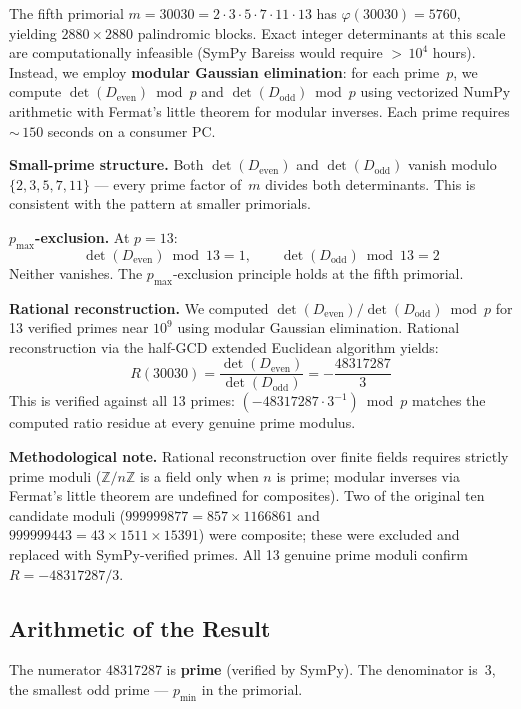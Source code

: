 \documentclass[11pt,letterpaper]{article}
\theoremstyle{definition}
\begin{document}
The fifth primorial $m = 30030 = 2 \cdot 3 \cdot 5 \cdot 7 \cdot 11 \cdot 13$ has $\varphi(30030) = 5760$, yielding $2880 \times 2880$ palindromic blocks. Exact integer determinants at this scale are computationally infeasible (SymPy Bareiss would require ${>}\,10^4$ hours). Instead, we employ \textbf{modular Gaussian elimination}: for each prime~$p$, we compute $\det(D_{\text{even}}) \bmod p$ and $\det(D_{\text{odd}}) \bmod p$ using vectorized NumPy arithmetic with Fermat's little theorem for modular inverses. Each prime requires ${\sim}\,150$ seconds on a consumer PC.

\medskip
\textbf{Small-prime structure.} Both $\det(D_{\text{even}})$ and $\det(D_{\text{odd}})$ vanish modulo $\{2, 3, 5, 7, 11\}$ --- every prime factor of~$m$ divides both determinants. This is consistent with the pattern at smaller primorials.

\textbf{$p_{\text{max}}$-exclusion.} At $p = 13$:
\[
\det(D_{\text{even}}) \bmod 13 = 1, \qquad \det(D_{\text{odd}}) \bmod 13 = 2
\]
Neither vanishes. The $p_{\text{max}}$-exclusion principle holds at the fifth primorial.

\medskip
\textbf{Rational reconstruction.} We computed $\det(D_{\text{even}}) / \det(D_{\text{odd}}) \bmod p$ for 13 verified primes near $10^9$ using modular Gaussian elimination. Rational reconstruction via the half-GCD extended Euclidean algorithm yields:
\[
\boxed{R(30030) = \frac{\det(D_{\text{even}})}{\det(D_{\text{odd}})} = -\frac{48317287}{3}}
\]
This is verified against all 13 primes: $(-48317287 \cdot 3^{-1}) \bmod p$ matches the computed ratio residue at every genuine prime modulus.

\medskip
\textbf{Methodological note.} Rational reconstruction over finite fields requires strictly prime moduli ($\mathbb{Z}/n\mathbb{Z}$ is a field only when $n$ is prime; modular inverses via Fermat's little theorem are undefined for composites). Two of the original ten candidate moduli ($999999877 = 857 \times 1166861$ and $999999443 = 43 \times 1511 \times 15391$) were composite; these were excluded and replaced with SymPy-verified primes. All 13 genuine prime moduli confirm $R = -48317287/3$.

\subsection{Arithmetic of the Result}

The numerator 48317287 is \textbf{prime} (verified by SymPy). The denominator is~3, the smallest odd prime --- $p_{\text{min}}$ in the primorial.
\end{document}

